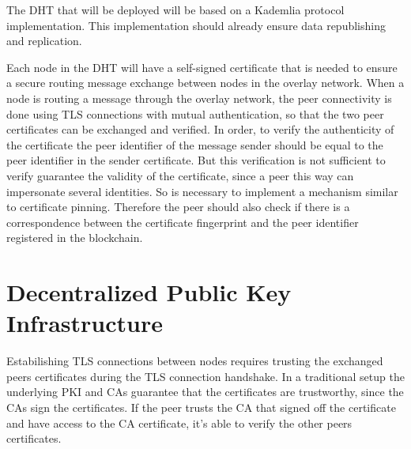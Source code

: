 The DHT that will be deployed will be based on a Kademlia protocol implementation.
This implementation should already ensure data republishing and replication.

Each node in the DHT will have a self-signed certificate that is needed to ensure a secure routing message exchange between nodes in the overlay network.
When a node is routing a message through the overlay network, the peer connectivity is done using TLS connections with mutual authentication, so that the two peer certificates can be exchanged and verified.
In order, to verify the authenticity of the certificate the peer identifier of the message sender should be equal to the peer identifier in the sender certificate.
But this verification is not sufficient to verify guarantee the validity of the certificate, since a peer this way can impersonate several identities.
So is necessary to implement a mechanism similar to certificate pinning. Therefore the peer should also check if there is a correspondence between the certificate fingerprint and the peer identifier registered in the blockchain.




\section{Decentralized Public Key Infrastructure} \label{ssec:blockchain}

Estabilishing \ac{TLS} connections between nodes requires trusting the exchanged peers certificates during the \ac{TLS} connection handshake.
In a traditional setup the underlying \ac{PKI} and \acp{CA} guarantee that the certificates are trustworthy, since the \acp{CA} sign the certificates.
If the peer trusts the \ac{CA} that signed off the certificate and have access to the \ac{CA} certificate, it's able to verify the other peers certificates.

